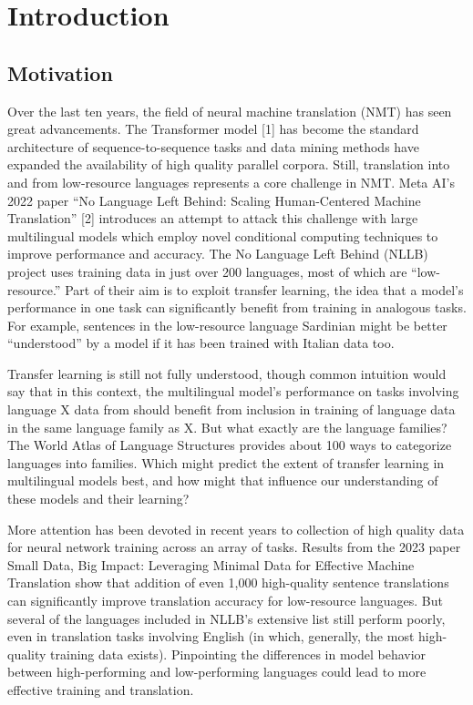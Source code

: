 

\chapter{Introduction}
\label{chap:introduction}

\section{Motivation}

Over the last ten years, the field of neural machine translation (NMT) has seen great advancements. The Transformer model [1] 
has become the standard architecture of sequence-to-sequence tasks and data mining methods have expanded the availability of 
high quality parallel corpora. Still, translation into and from low-resource languages represents a core challenge in NMT. 
Meta AI’s 2022 paper “No Language Left Behind: Scaling Human-Centered Machine Translation” [2] introduces an attempt to attack 
this challenge with large multilingual models which employ novel conditional computing techniques to improve performance and 
accuracy. The No Language Left Behind (NLLB) project uses training data in just over 200 languages, most of which are 
“low-resource.” Part of their aim is to exploit transfer learning, the idea that a model’s performance in one task can 
significantly benefit from training in analogous tasks. For example, sentences in the low-resource language Sardinian might 
be better “understood” by a model if it has been trained with Italian data too. 

Transfer learning is still not fully understood, though common intuition would say that in this context, the multilingual 
model’s performance on tasks involving language X data from should benefit from inclusion in training of language data in 
the same language family as X. But what exactly are the language families? The World Atlas of Language Structures provides 
about 100 ways to categorize languages into families. Which might predict the extent of transfer learning in multilingual 
models best, and how might that influence our understanding of these models and their learning?

More attention has been devoted in recent years to collection of high quality data for neural network training across an 
array of tasks. Results from the 2023 paper Small Data, Big Impact: Leveraging Minimal Data for Effective Machine Translation 
show that addition of even 1,000 high-quality sentence translations can significantly improve translation accuracy for 
low-resource languages. But several of the languages included in NLLB’s extensive list still perform poorly, even in translation 
tasks involving English (in which, generally, the most high-quality training data exists). Pinpointing the differences in model 
behavior between high-performing and low-performing languages could lead to more effective training and translation.


